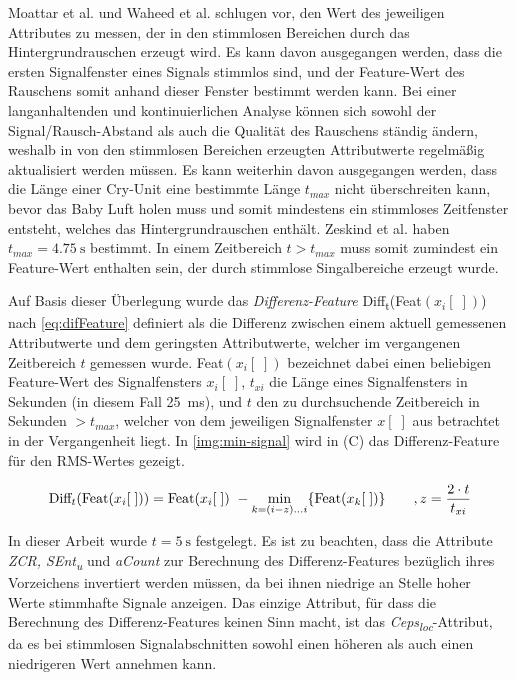Moattar et al. \cite{vad_Easy} und Waheed et al. \cite{vad_entropy} schlugen vor, den Wert des jeweiligen Attributes zu messen, der in den stimmlosen Bereichen durch das Hintergrundrauschen erzeugt wird. Es kann davon ausgegangen werden, dass die ersten Signalfenster eines Signals stimmlos sind, und der Feature-Wert des Rauschens somit anhand dieser Fenster bestimmt werden kann. Bei einer langanhaltenden und kontinuierlichen Analyse können sich sowohl der Signal/Rausch-Abstand als auch die Qualität des Rauschens ständig ändern, weshalb in von den stimmlosen Bereichen erzeugten Attributwerte regelmäßig aktualisiert werden müssen. Es kann weiterhin davon ausgegangen werden, dass die Länge einer Cry-Unit eine bestimmte Länge $t_{max}$ nicht überschreiten kann, bevor das Baby Luft holen muss und somit mindestens ein stimmloses Zeitfenster entsteht, welches das Hintergrundrauschen enthält. Zeskind et al. \cite[S. 325]{rythmic} haben $t_{max} = \SI{4.75}{\second}$ bestimmt. In einem Zeitbereich $ t > t_{max}$ muss somit zumindest ein Feature-Wert enthalten sein, der durch stimmlose Singalbereiche erzeugt wurde. 

Auf Basis dieser Überlegung wurde das \emph{Differenz-Feature} Diff\textsubscript{t}(Feat$(x_i[\;])$) nach \autoref{eq:difFeature} definiert als die Differenz zwischen einem aktuell gemessenen Attributwerte und dem geringsten Attributwerte, welcher im vergangenen Zeitbereich $t$ gemessen wurde. Feat$(x_i[\;])$ bezeichnet dabei einen beliebigen Feature-Wert des Signalfensters $x_i[\;]$, $t_{xi}$ die Länge eines Signalfensters in Sekunden (in diesem Fall \SI{25}{\milli\second}), und $t$ den zu durchsuchende Zeitbereich in Sekunden $> t_{max}$, welcher von dem jeweiligen Signalfenster $x[\;]$ aus betrachtet in der Vergangenheit liegt. In \autoref{img:min-signal} wird in (C) das Differenz-Feature für den RMS-Wertes gezeigt.

\begin{equation}
\text{Diff}_t(\text{Feat}(x_i[\;])) = \text{Feat}(x_i[\;])\ - \operatorname*{min}_{k=(i-z)...i}\{\text{Feat}(x_k[\;])\} \qquad , z = \frac{2 \cdot t}{t_{xi}}
\label{eq:difFeature}
\end{equation}

In dieser Arbeit wurde $t = \SI{5}{\second}$ festgelegt. Es ist zu beachten, dass die Attribute \emph{ZCR, SEnt\textsubscript{u}} und \emph{aCount} zur Berechnung des Differenz-Features bezüglich ihres Vorzeichens invertiert werden müssen, da bei ihnen niedrige an Stelle hoher Werte stimmhafte Signale anzeigen. Das einzige Attribut, für dass die Berechnung des Differenz-Features keinen Sinn macht, ist das \emph{Ceps\textsubscript{loc}}-Attribut, da es bei stimmlosen Signalabschnitten sowohl einen höheren als auch einen niedrigeren Wert annehmen kann.

